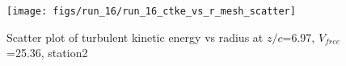 \begin{figure}[H]
\centering
\texttt{[image: figs/run\_16/run\_16\_ctke\_vs\_r\_mesh\_scatter]}
\caption{Scatter plot of turbulent kinetic energy vs radius at $z/c$=6.97, $V_{free}$=25.36, station2}
\label{fig:run_16_ctke_vs_r_mesh_scatter}
\end{figure}


